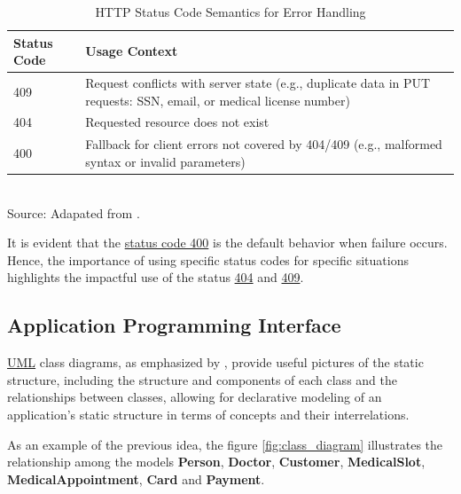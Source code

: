 \begin{table}[H]
\centering
\caption{HTTP Status Code Semantics for Error Handling}
\label{http_error_codes}
\begin{tabular}{p{}p{}}
\toprule
\textbf{Status Code} & \textbf{Usage Context} \\
\midrule
409 & Request conflicts with server state (e.g., duplicate data in PUT requests: SSN, email, or medical license number) \\ \hline
404 & Requested resource does not exist \\ \hline
400 & Fallback for client errors not covered by 404/409 (e.g., malformed syntax or invalid parameters) \\
\bottomrule
\end{tabular}
\\ \footnotesize Source: Adapated from \cite{rfc9110}.
\end{table}

It is evident that the \hyperref[tab:summary_http_status_codes]{status code 400} is the default behavior when failure occurs. Hence, the importance of using specific status
 codes for specific situations highlights the impactful use of the status \hyperref[appendix:http_status_codes_summary_appendix]{404} and \hyperref[appendix:http_status_codes_summary_appendix]{409}.

\subsection{Application Programming Interface}
\label{subsection:api}

\hyperref[appendix:glossary]{UML} class diagrams, as emphasized by \cite{BERARDI200570, herchi_abdessalem_2012}, provide useful pictures of the static structure, including the structure and components of each class and the relationships between classes, allowing for declarative modeling of an application's static structure in terms of concepts and their interrelations.

As an example of the previous idea, the figure \ref{fig:class_diagram} illustrates the relationship among the models \textbf{Person}, \textbf{Doctor}, \textbf{Customer}, \textbf{MedicalSlot}, \textbf{MedicalAppointment}, \textbf{Card} and \textbf{Payment}.


